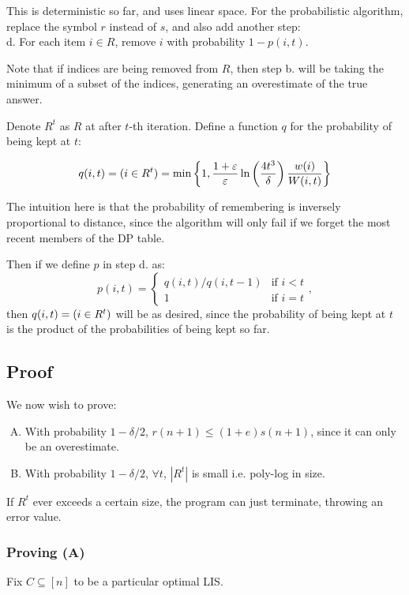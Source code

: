 \documentclass[11pt]{article}
\let\Pr\relax
\DeclareMathOperator*{\Pr}{\mathbb{P}}
\newcommand{\ve}{\varepsilon}
\begin{document}
This is deterministic so far, and uses linear space.
For the probabilistic algorithm, replace the symbol $r$ instead of $s$,
and also add another step: \\
\-\; d. For each item $i \in R$, remove $i$ with probability $1 - p(i, t)$.

Note that if indices are being removed from $R$, then step b. will be taking
the minimum of a subset of the indices, generating an overestimate of the true answer.

Denote $R^t$ as $R$ at after $t$-th iteration.
Define a function $q$ for the probability of being kept at $t$:

\[q(i,t) = \Pr(i \in R^t) = \min\left\{1, \frac{1+\ve}{\ve} \ln\left(\frac
{4t^3}{\delta}\right) \frac{w(i)}{W(i, t)}\right\}\]

The intuition here is that the probability of remembering is inversely
proportional to distance, since the algorithm will only fail if we forget the
most recent members of the DP table.

Then if we define $p$ in step d. as:
\[p(i, t) =
\begin{cases}
q(i, t) / q(i, t - 1) & \text{if } i < t \\
1 & \text{if } i = t
\end{cases},
\]
then $q(i,t) = \Pr(i \in R^t)$ will be as desired, since the probability of
being kept at $t$ is the product of the probabilities of being kept so far.

\subsection{Proof}

We now wish to prove:
\begin{enumerate}[(A)]
\item With probability $1 - \delta / 2$, $r(n+1) \leq (1+e) s(n+1)$, since it can only be an overestimate.
\item With probability $1 - \delta / 2$, $\forall t$, $|R^t|$ is small i.e.
poly-log in size.
\end{enumerate}

If $R^t$ ever exceeds a certain size, the program can just terminate, throwing
an error value.

\subsubsection{Proving (A)}

Fix $C \subseteq [n]$ to be a particular optimal LIS.
\end{document}
